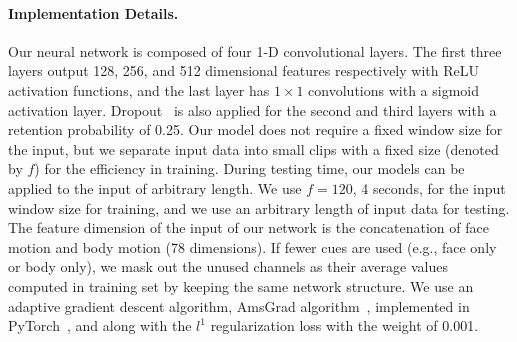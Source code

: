 
\paragraph{Implementation Details.}
Our neural network is composed of four 1-D convolutional layers. The first three layers output 128, 256, and 512 dimensional features respectively with ReLU activation functions, and the last layer has $1\times1$ convolutions with a sigmoid activation layer. Dropout~\cite{srivastava2014dropout} is also applied for the second and third layers with a retention probability of 0.25. Our model does not require a fixed window size for the input, but we separate input data into small clips with a fixed size (denoted by $f$) for the efficiency in training. During testing time, our models can be applied to the input of arbitrary length. We use $f=120$, 4 seconds, for the input window size for training, and we use an arbitrary length of input data for testing. The feature dimension of the input of our network is the concatenation of face motion and body motion (78 dimensions). If fewer cues are used (e.g., face only or body only), we mask out the unused channels as their average values computed in training set by keeping the same network structure. We use an adaptive gradient descent algorithm, AmsGrad algorithm~\cite{reddi2018convergence}, implemented in PyTorch~\cite{paszke2017automatic}, and along with the $l^1$ regularization loss with the weight of 0.001. 



